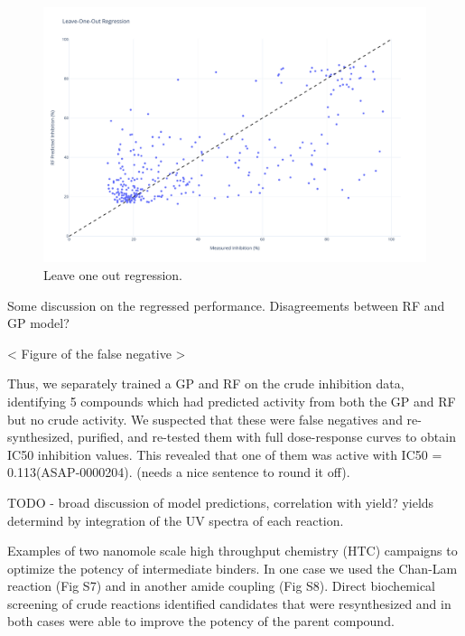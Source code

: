 \begin{figure}
    \centering
             \includegraphics[width=\textwidth]{Chapters/Crude/Figs/rf.pdf}
        \caption{Leave one out regression.}
        \label{fig:leave-one-out}
    \end{figure}

Some discussion on the regressed performance. Disagreements between RF and GP model?

< Figure of the false negative >

Thus, we separately trained a GP and RF on the crude inhibition data, identifying 5 compounds which had predicted activity from both the GP and RF but no crude activity. We suspected that these were false negatives and re-synthesized, purified, and re-tested them with full dose-response curves to obtain IC50 inhibition values. This revealed that one of them was active with IC50 = 0.113\uM (ASAP-0000204). (needs a nice sentence to round it off).

TODO - broad discussion of model predictions, correlation with yield?
yields determind by integration of the UV spectra of each reaction.

Examples of two nanomole scale high throughput chemistry (HTC) campaigns to optimize the potency of intermediate binders. In one case we used the Chan-Lam reaction (Fig S7) and in another amide coupling (Fig S8). Direct biochemical screening of crude reactions identified candidates that were resynthesized and in both cases were able to improve the potency of the parent compound.

